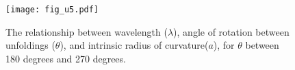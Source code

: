 %

\begin{figure}[!h]
  \centering
  \texttt{[image: fig\_u5.pdf]}
  \caption{The relationship between wavelength ($\lambda$), angle of rotation between unfoldings ($\theta$), and intrinsic radius of curvature($a$), for $\theta$ between 180 degrees and 270 degrees.}
  \label{fig:unf5}
\end{figure}

%

